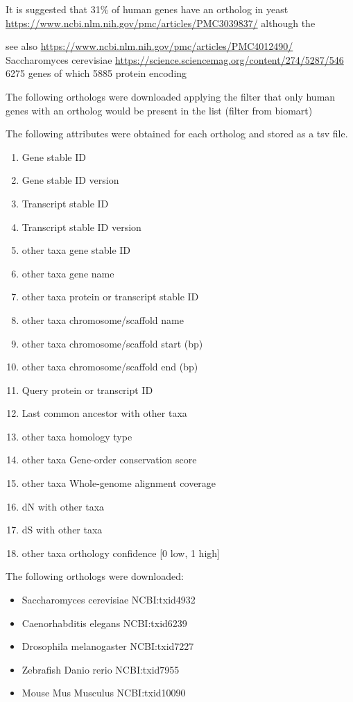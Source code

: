It is suggested that 31\% of human genes have an ortholog in yeast \url{https://www.ncbi.nlm.nih.gov/pmc/articles/PMC3039837/} although the 

see also \url{https://www.ncbi.nlm.nih.gov/pmc/articles/PMC4012490/} Saccharomyces cerevisiae \url{https://science.sciencemag.org/content/274/5287/546} 6275 genes of which 5885 protein encoding

The following orthologs were downloaded applying the filter that only human genes with an ortholog would be present in the list (filter from biomart)

The following attributes were obtained for each ortholog and stored as a tsv file.

\begin{enumerate}
    
\item{Gene stable ID}
\item{Gene stable ID version}
\item{Transcript stable ID}
\item{Transcript stable ID version}
\item{other taxa gene stable ID}
\item{other taxa gene name}
\item{other taxa protein or transcript stable ID}
\item{other taxa chromosome/scaffold name}
\item{other taxa chromosome/scaffold start (bp)}
\item{other taxa chromosome/scaffold end (bp)}
\item{Query protein or transcript ID}
\item{Last common ancestor with other taxa}
\item{other taxa homology type}
\item{other taxa Gene-order conservation score}
\item{other taxa Whole-genome alignment coverage}
\item{dN with other taxa}
\item{dS with other taxa}
\item{other taxa orthology confidence [0 low, 1 high]}

\end{enumerate}
The following orthologs were downloaded:

\begin{itemize}
   
\item{Saccharomyces cerevisiae NCBI:txid4932}
\item{Caenorhabditis elegans NCBI:txid6239}
\item{Drosophila melanogaster NCBI:txid7227}
\item{Zebrafish Danio rerio NCBI:txid7955}
\item{Mouse Mus Musculus NCBI:txid10090}

\end{itemize}

